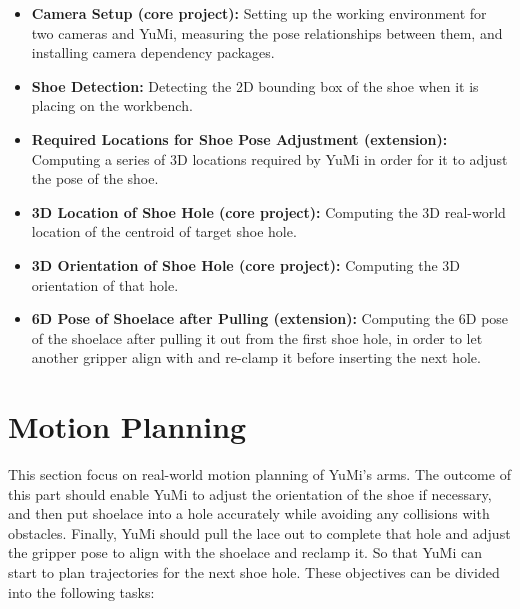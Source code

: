 \begin{itemize}
    \item \textbf{Camera Setup (core project):} Setting up the working environment for two cameras and YuMi, measuring the pose relationships between them, and installing camera dependency packages.
    \item \textbf{Shoe Detection:} Detecting the 2D bounding box of the shoe when it is placing on the workbench.
    \item \textbf{Required Locations for Shoe Pose Adjustment (extension):} Computing a series of 3D locations required by YuMi in order for it to adjust the pose of the shoe.
    \item \textbf{3D Location of Shoe Hole (core project):} Computing the 3D real-world location of the centroid of target shoe hole.
    \item \textbf{3D Orientation of Shoe Hole (core project):} Computing the 3D orientation of that hole.
    \item \textbf{6D Pose of Shoelace after Pulling (extension):} Computing the 6D pose of the shoelace after pulling it out from the first shoe hole, in order to let another gripper align with and re-clamp it before inserting the next hole.
\end{itemize}


\section{Motion Planning}
This section focus on real-world motion planning of YuMi's arms. The outcome of this part should enable YuMi to adjust the orientation of the shoe if necessary, and then put shoelace into a hole accurately while avoiding any collisions with obstacles. Finally, YuMi should pull the lace out to complete that hole and adjust the gripper pose to align with the shoelace and reclamp it. So that YuMi can start to plan trajectories for the next shoe hole. These objectives can be divided into the following tasks:

